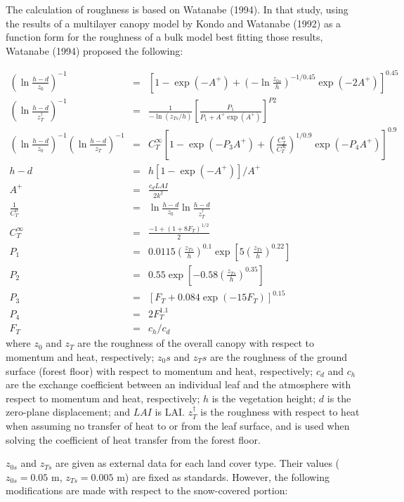 The calculation of roughness is based on Watanabe (1994). In that study, using the results of a multilayer canopy model by Kondo and Watanabe (1992) as a function form for the roughness of a bulk
model best fitting those results, Watanabe (1994) proposed the following:

\begin{eqnarray}
 \left(\ln \frac{h-d}{z_0}\right)^{-1} &=&
 \left[ 1 - \exp( -A^+) + \left(-\ln \frac{z_{0s}}{h}\right)^{-1/0.45}
  \exp(-2A^+)\right]^{0.45} \\
 \left(\ln \frac{h-d}{z_T^{\dagger}}\right)^{-1} &=&
 \frac{1}{-\ln(z_{Ts}/h)} \left[ \frac{P_1}{P_1 + A^+ \exp({A^+})}\right] ^{P2} \\
 \left(\ln \frac{h-d}{z_0}\right)^{-1} \left(\ln \frac{h-d}{z_T}\right)^{-1}
 &=& C_T^{\infty} \left[1-\exp(-P_3 A^+)
  + \left(\frac{C_T^0}{C_T^{\infty}}\right)^{1/0.9} \exp(-P_4 A^+)\right]^{0.9} \\
 h-d &=& h [1-\exp(-A^+)] / {A^+} \\
 A^+ &=& \frac{c_d LAI}{2k^2} \\
 \frac1{C_T^0} &=& \ln \frac{h-d}{z_0} \ln \frac{h-d}{z_T^{\dagger}} \\
 C_T^{\infty} &=& \frac{-1+(1+8F_T)^{1/2}}{2} \\
 P_1 &=& 0.0115 \left(\frac{z_{Ts}}{h}\right)^{0.1}
  \exp\left[5 \left(\frac{z_{Ts}}{h}\right)^{0.22}\right] \\
 P_2 &=& 0.55 \exp\left[-0.58 \left(\frac{z_{Ts}}{h}\right)^{0.35}\right] \\
 P_3 &=& [F_T + 0.084 \exp(-15 F_T)]^{0.15} \\
 P_4 &=& 2 F_T^{1.1} \\
 F_T &=& c_h / c_d
\end{eqnarray} where \(z_0\) and \(z_T\) are the roughness of the overall canopy with respect to momentum and heat, respectively; \(z_0s\) and \(z_Ts\) are the roughness of the ground surface (forest floor) with
respect to momentum and heat, respectively; \(c_d\) and \(c_h\) are the exchange coefficient between an individual leaf and the atmosphere with respect to momentum and heat, respectively; \(h\) is the
vegetation height; \(d\) is the zero-plane displacement; and \(LAI\) is LAI. \(z_T^{\dagger}\) is the roughness with respect to heat when assuming no transfer of heat to or from the leaf surface, and
is used when solving the coefficient of heat transfer from the forest floor.

\(z_{0s}\) and \(z_{Ts}\) are given as external data for each land cover type. Their values (\(z_{0s}=0.05\) m, \(z_{Ts}=0.005\) m) are fixed as standards. However, the following modifications are
made with respect to the snow-covered portion:

